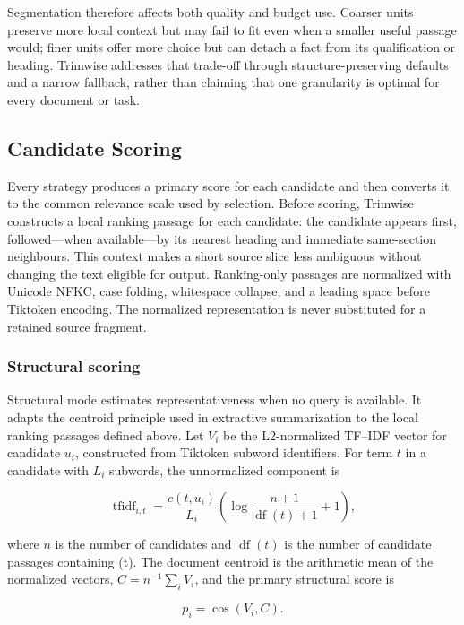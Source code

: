 \documentclass[
]{article}
\begin{document}
Segmentation therefore affects both quality and budget use. Coarser
units preserve more local context but may fail to fit even when a
smaller useful passage would; finer units offer more choice but can
detach a fact from its qualification or heading. Trimwise addresses that
trade-off through structure-preserving defaults and a narrow fallback,
rather than claiming that one granularity is optimal for every document
or task.

\subsection{Candidate Scoring}\label{candidate-scoring}

Every strategy produces a primary score for each candidate and then
converts it to the common relevance scale used by selection. Before
scoring, Trimwise constructs a local ranking passage for each candidate:
the candidate appears first, followed---when available---by its nearest
heading and immediate same-section neighbours. This context makes a
short source slice less ambiguous without changing the text eligible for
output. Ranking-only passages are normalized with Unicode NFKC, case
folding, whitespace collapse, and a leading space before Tiktoken
encoding. The normalized representation is never substituted for a
retained source fragment.

\subsubsection{Structural scoring}\label{structural-scoring}

Structural mode estimates representativeness when no query is available.
It adapts the centroid principle used in extractive summarization
\citep{radev-etal-2000-centroid} to the local ranking passages defined
above. Let \(V_i\) be the L2-normalized TF--IDF vector for candidate
\(u_i\), constructed from Tiktoken subword identifiers. For term \(t\)
in a candidate with \(L_i\) subwords, the unnormalized component is

\[
\operatorname{tfidf}_{i,t} = \frac{c(t,u_i)}{L_i}
\left(\log\frac{n+1}{\operatorname{df}(t)+1}+1\right),
\]

where \(n\) is the number of candidates and \(\operatorname{df}(t)\) is
the number of candidate passages containing (t). The document centroid
is the arithmetic mean of the normalized vectors,
\(C=n^{-1}\sum_i V_i\), and the primary structural score is

\[
p_i = \cos(V_i, C).
\]
\end{document}
